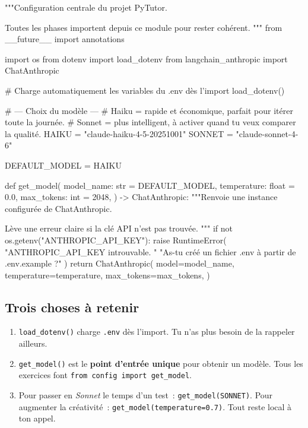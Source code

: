 \documentclass[11pt,a4paper]{article}
\begin{document}
\begin{pythoncode}
"""Configuration centrale du projet PyTutor.

Toutes les phases importent depuis ce module pour rester cohérent.
"""
from __future__ import annotations

import os
from dotenv import load_dotenv
from langchain_anthropic import ChatAnthropic

# Charge automatiquement les variables du .env dès l'import
load_dotenv()

# --- Choix du modèle ---
# Haiku  = rapide et économique, parfait pour itérer toute la journée.
# Sonnet = plus intelligent, à activer quand tu veux comparer la qualité.
HAIKU  = "claude-haiku-4-5-20251001"
SONNET = "claude-sonnet-4-6"

DEFAULT_MODEL = HAIKU


def get_model(
    model_name: str = DEFAULT_MODEL,
    temperature: float = 0.0,
    max_tokens: int = 2048,
) -> ChatAnthropic:
    """Renvoie une instance configurée de ChatAnthropic.

    Lève une erreur claire si la clé API n'est pas trouvée.
    """
    if not os.getenv("ANTHROPIC_API_KEY"):
        raise RuntimeError(
            "ANTHROPIC_API_KEY introuvable. "
            "As-tu créé un fichier .env à partir de .env.example ?"
        )
    return ChatAnthropic(
        model=model_name,
        temperature=temperature,
        max_tokens=max_tokens,
    )
\end{pythoncode}

\subsection{Trois choses à retenir}

\begin{enumerate}[leftmargin=*]
  \item \texttt{load\_dotenv()} charge \texttt{.env} dès l'import. Tu
        n'as plus besoin de la rappeler ailleurs.
  \item \texttt{get\_model()} est le \textbf{point d'entrée unique}
        pour obtenir un modèle. Tous les exercices font
        \texttt{from config import get\_model}.
  \item Pour passer en \emph{Sonnet} le temps d'un test~:
        \texttt{get\_model(SONNET)}. Pour augmenter la créativité~:
        \texttt{get\_model(temperature=0.7)}. Tout reste local à ton
        appel.
\end{enumerate}
\end{document}
